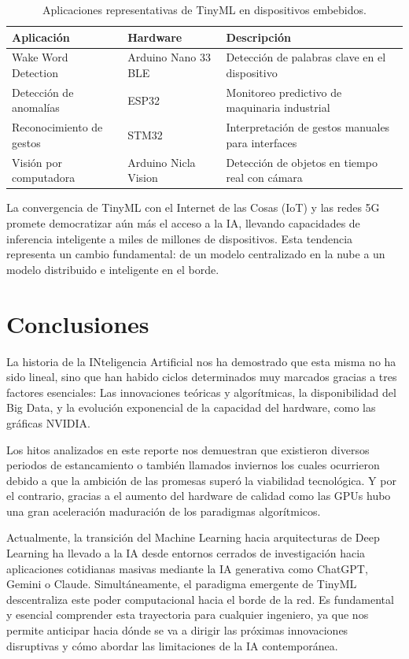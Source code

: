 \documentclass[12pt,a4paper]{article}
\begin{document}
\begin{table}[htbp]
    \centering
    \caption{Aplicaciones representativas de TinyML en dispositivos embebidos.}
    \label{tab:tinyml}
    \begin{tabular}{@{}C{3cm}C{3cm}C{6cm}@{}}
        \toprule
        \textbf{Aplicación} & \textbf{Hardware} & \textbf{Descripción} \\ \midrule
        Wake Word Detection & Arduino Nano 33 BLE & Detección de palabras clave en el dispositivo \\
        Detección de anomalías & ESP32 & Monitoreo predictivo de maquinaria industrial \\
        Reconocimiento de gestos & STM32 & Interpretación de gestos manuales para interfaces \\
        Visión por computadora & Arduino Nicla Vision & Detección de objetos en tiempo real con cámara \\ \bottomrule
    \end{tabular}
\end{table}

La convergencia de TinyML con el Internet de las Cosas (IoT) y las redes 5G promete democratizar aún más el acceso a la IA, llevando capacidades de inferencia inteligente a miles de millones de dispositivos. Esta tendencia representa un cambio fundamental: de un modelo centralizado en la nube a un modelo distribuido e inteligente en el borde.

\section{Conclusiones}

La historia de la INteligencia Artificial nos ha demostrado que esta misma no ha sido lineal, sino que han habido ciclos determinados muy marcados gracias a tres factores esenciales: Las innovaciones teóricas y algorítmicas, la disponibilidad del Big Data, y la evolución exponencial de la capacidad del hardware, como las gráficas NVIDIA.

Los hitos analizados en este reporte nos demuestran que existieron diversos periodos de estancamiento o también llamados inviernos los cuales ocurrieron debido a que la ambición de las promesas superó la viabilidad tecnológica. Y por el contrario, gracias a el aumento del hardware de calidad como las GPUs hubo una gran aceleración maduración de los paradigmas algorítmicos.

Actualmente, la transición del Machine Learning hacia arquitecturas de Deep Learning ha llevado a la IA desde entornos cerrados de investigación hacia aplicaciones cotidianas masivas mediante la IA generativa como ChatGPT, Gemini o Claude. Simultáneamente, el paradigma emergente de TinyML descentraliza este poder computacional hacia el borde de la red. Es fundamental y esencial comprender esta trayectoria para cualquier ingeniero, ya que nos permite anticipar hacia dónde se va a dirigir las próximas innovaciones disruptivas y cómo abordar las limitaciones de la IA contemporánea.

\newpage
\nocite{zenil2019}

\end{document}
